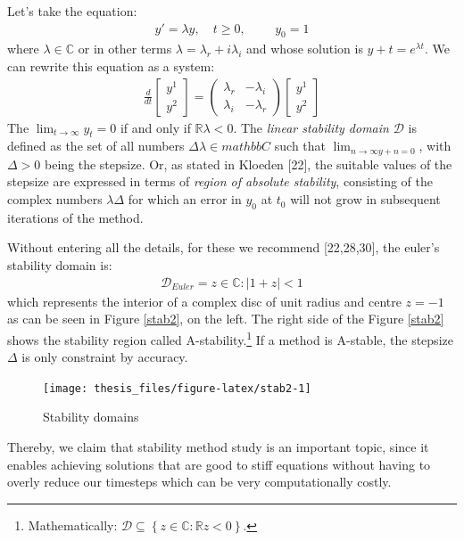 \documentclass[12pt,twoside]{reedthesis}
\theoremstyle{definition}
\theoremstyle{definition}
\theoremstyle{remark}
\begin{document}
  Let's take the equation:
  \begin{align}
  y' = \lambda y,  \,\,\,\,\,\, t \geq 0, \,\,\,\,\,\,\,\,\,\,\,\,\,\, y_0 = 1
  \end{align}
  where \(\lambda \in \mathbb{C}\) or in other terms
  \(\lambda = \lambda_r + i \lambda_i\) and whose solution is
  \(y+t = e^{\lambda t}\). We can rewrite this equation as a system:
  \begin{align}
  \frac{d}{dt} \begin{bmatrix} y^1 \\ y^2 \end{bmatrix} = 
  \begin{pmatrix} 
  \lambda_r & - \lambda_i \\
  \lambda_i & - \lambda_r 
  \end{pmatrix}
  \begin{bmatrix} y^1 \\ y^2 \end{bmatrix}
  \end{align}
  The \(\lim_{t \to \infty} y_t = 0\) if and only if
  \(\mathbb{R} \lambda < 0\). The \emph{linear stability domain}
  \(\mathcal{D}\) is defined as the set of all numbers
  \(\Delta \lambda \in mathbb{C}\) such that
  \(\lim_{n \to \infty y+n = 0}\), with \(\Delta > 0\) being the stepsize.
  Or, as stated in Kloeden {[}22{]}, the suitable values of the stepsize
  are expressed in terms of \emph{region of absolute stability},
  consisting of the complex numbers \(\lambda \Delta\) for which an error
  in \(y_0\) at \(t_0\) will not grow in subsequent iterations of the
  method.
  
  Without entering all the details, for these we recommend {[}22,28,30{]},
  the euler's stability domain is:
  \begin{align*}
  \mathcal{D}_{Euler} = z \in \mathbb{C} : \mid 1 + z \mid < 1
  \end{align*}
  which represents the interior of a complex disc of unit radius and
  centre \(z = -1\) as can be seen in Figure \ref{stab2}, on the left. The
  right side of the Figure \ref{stab2} shows the stability region called
  A-stability.\footnote{Mathematically:
    \(\mathcal{D} \subseteq \left\{ z \in \mathbb{C} : \mathbb{R} z < 0 \right\}\).}
  If a method is A-stable, the stepsize \(\Delta\) is only constraint by
  accuracy.
  \begin{figure}
  
  \texttt{[image: thesis\_files/figure-latex/stab2-1]} \hfill{}
  
  \caption{Stability domains \label{stab2}}\label{fig:stab2}
  \end{figure}
  Thereby, we claim that stability method study is an important topic,
  since it enables achieving solutions that are good to stiff equations
  without having to overly reduce our timesteps which can be very
  computationally costly.
  
\end{document}
